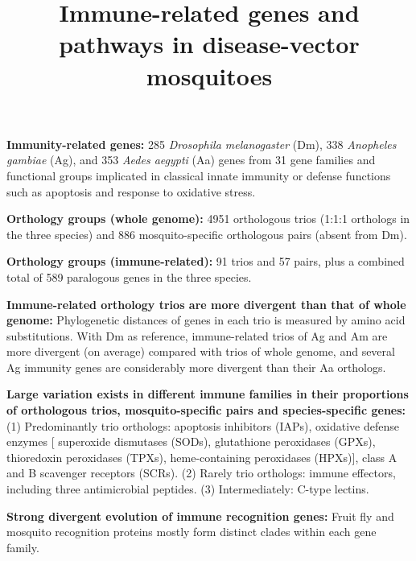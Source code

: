 \documentclass[11pt]{article}
\title{Immune-related genes and pathways in disease-vector mosquitoes}
\author{}
\date{}
\begin{document}
  \maketitle

  \linenumbers
\textbf{Immunity-related genes:} 
285 \textit{Drosophila melanogaster} (Dm), 338 \textit{Anopheles gambiae} (Ag), and 353 \textit{Aedes aegypti} (Aa) genes from 31 gene families and functional groups implicated in classical innate immunity or defense functions such as apoptosis and response to oxidative stress. 

\newline

\textbf{Orthology groups (whole genome):} 
4951 orthologous trios (1:1:1 orthologs in the three species) and 886 mosquito-specific orthologous pairs (absent from Dm). 

\newline

\textbf{Orthology groups (immune-related):} 
91 trios and 57 pairs, plus a combined total of 589 paralogous genes in the three species. 

\newline

\textbf{Immune-related orthology trios are more divergent than that of whole genome:}
Phylogenetic distances of genes in each trio is measured by amino acid substitutions. 
With Dm as reference, immune-related trios of Ag and Am are more divergent (on average) compared with trios of whole genome, and several Ag immunity genes are considerably more divergent than their Aa orthologs.

\newline

\textbf{Large variation exists in different immune families in their proportions of orthologous trios,
mosquito-specific pairs and species-specific genes:}
(1) Predominantly trio orthologs: 
apoptosis inhibitors (IAPs), 
oxidative defense enzymes [
    superoxide dismutases (SODs), 
    glutathione peroxidases (GPXs), 
    thioredoxin peroxidases (TPXs), 
    heme-containing peroxidases (HPXs)],
class A and B scavenger receptors (SCRs). 
\newline
(2) Rarely trio orthologs: 
immune effectors, including three antimicrobial peptides.
\newline
(3) Intermediately: 
C-type lectins.

\newline

\textbf{Strong divergent evolution of immune recognition genes:}
Fruit fly and mosquito recognition proteins mostly form distinct clades within each gene family.
\end{document}
